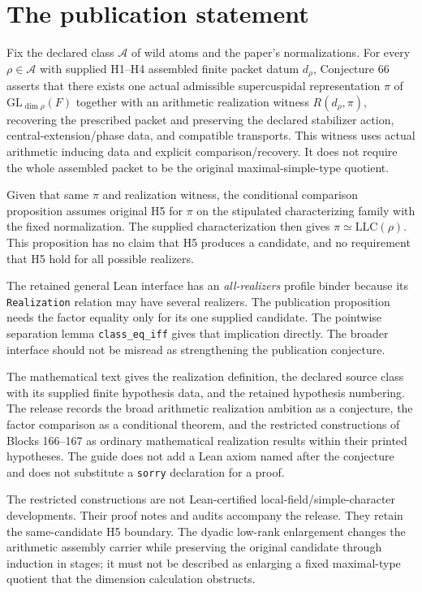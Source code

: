 \documentclass[10pt,oneside]{book}
\begin{document}

\section{The publication statement}
Fix the declared class \(\mathcal A\) of wild atoms and the paper's normalizations. For every \(\rho\in\mathcal A\) with supplied H1--H4 assembled finite packet datum \(d_\rho\), Conjecture 66 asserts that there exists one actual admissible supercuspidal representation \(\pi\) of \(\mathrm{GL}_{\dim\rho}(F)\) together with an arithmetic realization witness \(R(d_\rho,\pi)\), recovering the prescribed packet and preserving the declared stabilizer action, central-extension/phase data, and compatible transports. This witness uses actual arithmetic inducing data and explicit comparison/recovery. It does not require the whole assembled packet to be the original maximal-simple-type quotient.

Given that same \(\pi\) and realization witness, the conditional comparison proposition assumes original H5 for \(\pi\) on the stipulated characterizing family with the fixed normalization. The supplied characterization then gives \(\pi\simeq\mathrm{LLC}(\rho)\). This proposition has no claim that H5 produces a candidate, and no requirement that H5 hold for all possible realizers.

The retained general Lean interface has an \emph{all-realizers} profile binder because its \texttt{Realization} relation may have several realizers. The publication proposition needs the factor equality only for its one supplied candidate. The pointwise separation lemma \texttt{class\_eq\_iff} gives that implication directly. The broader interface should not be misread as strengthening the publication conjecture.

The mathematical text gives the realization definition, the declared source class with its supplied finite hypothesis data, and the retained hypothesis numbering. The release records the broad arithmetic realization ambition as a conjecture, the factor comparison as a conditional theorem, and the restricted constructions of Blocks 166--167 as ordinary mathematical realization results within their printed hypotheses. The guide does not add a Lean axiom named after the conjecture and does not substitute a \texttt{sorry} declaration for a proof.

The restricted constructions are not Lean-certified local-field/simple-character developments. Their proof notes and audits accompany the release. They retain the same-candidate H5 boundary. The dyadic low-rank enlargement changes the arithmetic assembly carrier while preserving the original candidate through induction in stages; it must not be described as enlarging a fixed maximal-type quotient that the dimension calculation obstructs.
\end{document}
